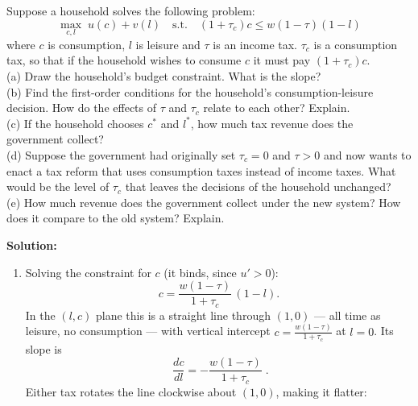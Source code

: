 \documentclass[12pt, letterpaper]{article}
\newcommand{\dd}[2]{\dfrac{d #1}{d #2}}
\begin{document}
\begin{tcolorbox}[oddbox,title={Problem 7.3 \quad Consumption Taxes and Labor Supply}]
\begin{tcolorbox}[questionbox]
Suppose a household solves the following problem:
\[
\max_{c,l}\;u(c)+v(l)\quad\text{s.t.}\quad(1+\tau_c)c\le w(1-\tau)(1-l)
\]
where $c$ is consumption, $l$ is leisure and $\tau$ is an income tax. $\tau_c$ is a
consumption tax, so that if the household wishes to consume $c$ it must pay $(1+\tau_c)c$.\\[3pt]
(a) Draw the household's budget constraint. What is the slope?\\
(b) Find the first-order conditions for the household's consumption-leisure decision. How do
the effects of $\tau$ and $\tau_c$ relate to each other? Explain.\\
(c) If the household chooses $c^*$ and $l^*$, how much tax revenue does the government
collect?\\
(d) Suppose the government had originally set $\tau_c=0$ and $\tau>0$ and now wants to enact
a tax reform that uses consumption taxes instead of income taxes. What would be the level of
$\tau_c$ that leaves the decisions of the household unchanged?\\
(e) How much revenue does the government collect under the new system? How does it compare
to the old system? Explain.
\end{tcolorbox}

\textbf{Solution:}

\begin{enumerate}
\item Solving the constraint for $c$ (it binds, since $u'>0$):
\[
c=\frac{w(1-\tau)}{1+\tau_c}\,(1-l).
\]
In the $(l,c)$ plane this is a straight line through $(1,0)$ --- all time as leisure, no
consumption --- with vertical intercept $c=\frac{w(1-\tau)}{1+\tau_c}$ at $l=0$. Its slope is
\[
\boxed{\;\dd{c}{l}=-\frac{w(1-\tau)}{1+\tau_c}\;}.
\]
Either tax rotates the line clockwise about $(1,0)$, making it flatter:

\begin{center}
\end{center}


\end{enumerate}
\end{tcolorbox}
\end{document}
